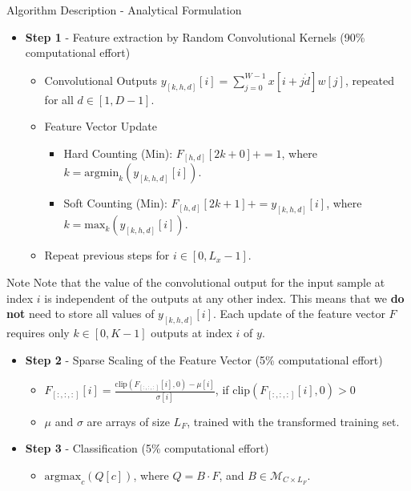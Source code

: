 \documentclass[10pt,aspectratio=169]{beamer}
\begin{document}
\begin{frame}[fragile]{Algorithm Description - Analytical Formulation}
	\begin{itemize}
		\item \textbf{Step 1} - Feature extraction by Random Convolutional Kernels (90\% computational effort)

		\begin{itemize}
			\item Convolutional Outputs $y_{[k,h,d]}[i] = \sum_{j=0}^{W-1} x[i+j\dot d] w[j]$, repeated for all $d \in [1,D-1]$.
			\item Feature Vector Update
				\begin{itemize}
					\item Hard Counting (Min): $F_{[h,d]}[2k+0] += 1$,              where $k = \text{argmin}_k (y_{[k,h,d]}[i])$.
					\item Soft Counting (Min): $F_{[h,d]}[2k+1] += y_{[k,h,d]}[i]$, where $k = \text{max}_k (y_{[k,h,d]}[i])$.
				\end{itemize}
			\item Repeat previous steps for $i \in [0, L_x-1]$. 
		\end{itemize}
	\end{itemize}
		\begin{block}{Note}
			Note that the value of the convolutional output for the input sample at index $i$ is independent of the outputs at any other index.
			This means that we \textbf{do not} need to store all values of $y_{[k,h,d]}[i]$. Each update of the feature vector $F$ requires only $k \in [0,K-1]$ outputs at index $i$ of $y$.

		\end{block}

	\begin{itemize}
		\item \textbf{Step 2} - Sparse Scaling of the Feature Vector (5\% computational effort)

		\begin{itemize}
			\item $F_{[:,:,:]}[i] = \frac{\text{clip}(F_{[:,:,:]}[i],0) - \mu[i]}{\sigma[i]}$, if $\text{clip}(F_{[:,:,:]}[i],0) > 0$
			\item $\mu$ and $\sigma$ are arrays of size $L_F$, trained with the transformed training set.
		\end{itemize}
		
		\item \textbf{Step 3} - Classification (5\% computational effort)

		\begin{itemize}
			\item $\text{argmax}_c (Q[c])$, where $Q = B \cdot F$, and  $B \in \mathcal{M}_{C \times L_F}$.
		\end{itemize}
	\end{itemize}
\end{frame}
\end{document}
